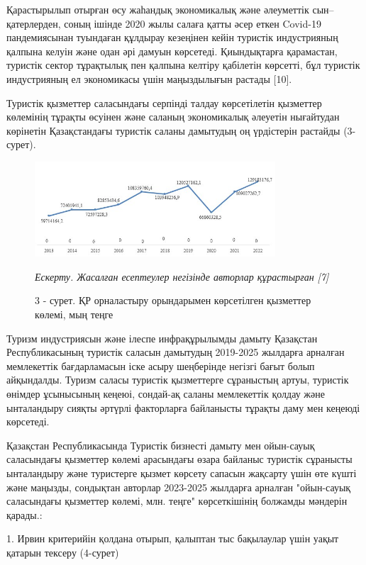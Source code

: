 \begin{multicols}{2}
Қарастырылып отырған өсу жаһандық экономикалық және әлеуметтік
сын--қатерлерден, соның ішінде 2020 жылы салаға қатты әсер еткен
Covid-19 пандемиясынан туындаған құлдырау кезеңінен кейін туристік
индустрияның қалпына келуін және одан әрі дамуын көрсетеді. Қиындықтарға
қарамастан, туристік сектор тұрақтылық пен қалпына келтіру қабілетін
көрсетті, бұл туристік индустрияның ел экономикасы үшін маңыздылығын
растады {[}10{]}.

Туристік қызметтер саласындағы серпінді талдау көрсетілетін қызметтер
көлемінің тұрақты өсуінен және саланың экономикалық әлеуетін нығайтудан
көрінетін Қазақстандағы туристік саланы дамытудың оң үрдістерін растайды
(3-сурет).
\end{multicols}

\begin{figure}[H]
	\centering
	\includegraphics[width=0.8\textwidth]{media/ekon/image6.3}
	\caption*{3 - сурет. ҚР орналастыру орындарымен көрсетілген қызметтер
  көлемі, мың теңге}
  \emph{Ескерту. Жасалған есептеулер негізінде авторлар құрастырған {[}7{]}}
\end{figure}

\begin{multicols}{2}
Туризм индустриясын және ілеспе инфрақұрылымды дамыту Қазақстан
Республикасының туристік саласын дамытудың 2019-2025 жылдарға арналған
мемлекеттік бағдарламасын іске асыру шеңберінде негізгі бағыт болып
айқындалды. Туризм саласы туристік қызметтерге сұраныстың артуы,
туристік өнімдер ұсынысының кеңеюі, сондай-ақ саланы мемлекеттік қолдау
және ынталандыру сияқты әртүрлі факторларға байланысты тұрақты даму мен
кеңеюді көрсетеді.

Қазақстан Республикасында Туристік бизнесті дамыту мен ойын-сауық
саласындағы қызметтер көлемі арасындағы өзара байланыс туристік
сұранысты ынталандыру және туристерге қызмет көрсету сапасын жақсарту
үшін өте күшті және маңызды, сондықтан авторлар 2023-2025 жылдарға
арналған "ойын-сауық саласындағы қызметтер көлемі, млн. теңге"
көрсеткішінің болжамды мәндерін қарады.:

1. Ирвин критерийін қолдана отырып, қалыптан тыс бақылаулар үшін уақыт
қатарын тексеру (4-сурет)
\end{multicols}

